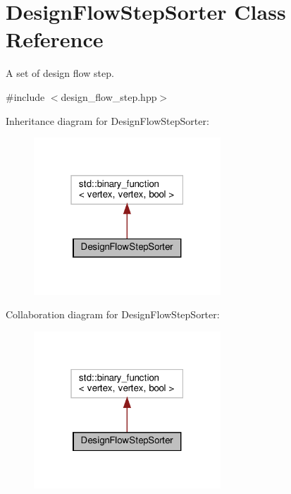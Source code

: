 \hypertarget{classDesignFlowStepSorter}{}\section{Design\+Flow\+Step\+Sorter Class Reference}
\label{classDesignFlowStepSorter}


A set of design flow step.  




{\ttfamily \#include $<$design\+\_\+flow\+\_\+step.\+hpp$>$}



Inheritance diagram for Design\+Flow\+Step\+Sorter\+:
\nopagebreak
\begin{figure}[H]
\begin{center}
\leavevmode
\includegraphics[width=199pt]{db/d11/classDesignFlowStepSorter__inherit__graph}
\end{center}
\end{figure}


Collaboration diagram for Design\+Flow\+Step\+Sorter\+:
\nopagebreak
\begin{figure}[H]
\begin{center}
\leavevmode
\includegraphics[width=199pt]{d3/d8c/classDesignFlowStepSorter__coll__graph}
\end{center}
\end{figure}

